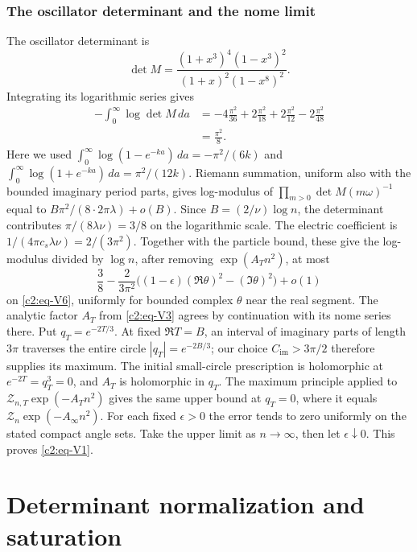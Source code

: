 \subsubsection{The oscillator determinant and the nome limit}
The oscillator determinant is
\[
 \det M=\frac{(1+x^3)^4(1-x^3)^2}{(1+x)^2(1-x^8)^2}.
\]
Integrating its logarithmic series gives
\[
\begin{split}
 -\int_0^\infty\log\det M\,da
 &=-4\frac{\pi^2}{36}+2\frac{\pi^2}{18}
    +2\frac{\pi^2}{12}-2\frac{\pi^2}{48}\\
 &=\frac{\pi^2}{8}.
\end{split}
\]
Here we used
\(\int_0^\infty\log(1-e^{-ka})\,da=-\pi^2/(6k)\) and
\(\int_0^\infty\log(1+e^{-ka})\,da=\pi^2/(12k)\). Riemann summation, uniform also with the bounded imaginary period parts, gives log-modulus of \(\prod_{m>0}\det M(m\omega)^{-1}\) equal to \(B\pi^2/(8\cdot2\pi\lambda)+o(B)\). Since \(B=(2/\nu)\log n\), the determinant contributes
\(\pi/(8\lambda\nu)=3/8\) on the logarithmic scale. The electric
coefficient is \(1/(4\pi c_s\lambda\nu)=2/(3\pi^2)\).
Together with the particle bound, these give the log-modulus divided by
\(\log n\), after removing \(\exp(A_T n^2)\), at most
\[
 \frac38-\frac{2}{3\pi^2}\big((1-\epsilon)(\Re\theta)^2-(\Im\theta)^2\big)+o(1)
\]
on \eqref{c2:eq-V6}, uniformly for bounded complex \(\theta\) near the real segment. The analytic factor \(A_T\) from \eqref{c2:eq-V3} agrees by continuation with its nome series there. Put \(q_T=e^{-2T/3}\). At fixed \(\Re T=B\), an interval of
imaginary parts of length \(3\pi\) traverses the entire circle
\(|q_T|=e^{-2B/3}\); our choice \(C_{\mathrm{im}}>3\pi/2\)
therefore supplies its maximum. The initial small-circle prescription is
holomorphic at \(e^{-2T}=q_T^3=0\), and \(A_T\) is holomorphic in
\(q_T\). The maximum principle applied to
\(\mathcal Z_{n,T}\exp(-A_Tn^2)\) gives the same upper bound at
\(q_T=0\), where it equals
\(\mathcal Z_n\exp(-A_\infty n^2)\). For each fixed
\(\epsilon>0\) the error tends to zero uniformly on the stated compact
angle sets. Take the upper limit as \(n\to\infty\), then let
\(\epsilon\downarrow0\). This proves \eqref{c2:eq-V1}.

\section{Determinant normalization and saturation}
\label{c2:sec-normalization}

